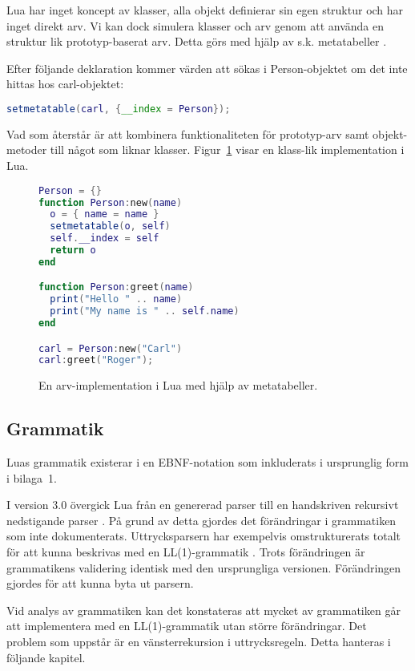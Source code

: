 Lua har inget koncept av klasser, alla objekt definierar sin egen struktur och
har inget direkt arv. Vi kan dock simulera klasser och arv genom att använda
en struktur lik prototyp-baserat arv. Detta görs med hjälp av s.k.
metatabeller \citep[s. 151]{ir06}.

Efter följande deklaration kommer värden att sökas i Person-objektet om det
inte hittas hos carl-objektet:
\\

\begin{lstlisting}[language=Lua]
setmetatable(carl, {__index = Person});
\end{lstlisting}
\vspace{-2em}
Vad som återstår är att kombinera funktionaliteten för prototyp-arv samt
objekt-metoder till något som liknar klasser. Figur~\ref{fig:class} visar en
klass-lik implementation i Lua.

\begin{figure}[ht]
  \begin{lstlisting}[language=Lua]
Person = {}
function Person:new(name)
  o = { name = name }
  setmetatable(o, self)
  self.__index = self
  return o
end

function Person:greet(name)
  print("Hello " .. name)
  print("My name is " .. self.name)
end

carl = Person:new("Carl")
carl:greet("Roger");
  \end{lstlisting}
  \caption{En arv-implementation i Lua med hjälp av metatabeller.}
  \label{fig:class}
\end{figure}

\subsection{Grammatik}

Luas grammatik existerar i en EBNF-notation som inkluderats i
ursprunglig form i bilaga~1.

I version 3.0 övergick Lua från en genererad parser till en handskriven
rekursivt nedstigande parser \citep{luaimp}. På grund av detta gjordes det
förändringar i grammatiken som inte dokumenterats. Uttrycksparsern har
exempelvis omstrukturerats totalt för att kunna beskrivas med en
LL(1)-grammatik \citep[s. 175]{bf09}. Trots förändringen är grammatikens
validering identisk med den ursprungliga versionen. Förändringen gjordes för
att kunna byta ut parsern.

Vid analys av grammatiken kan det konstateras att mycket av grammatiken går att
implementera med en LL(1)-grammatik utan större förändringar. Det problem som
uppstår är en vänsterrekursion i uttrycksregeln. Detta hanteras i följande
kapitel.

